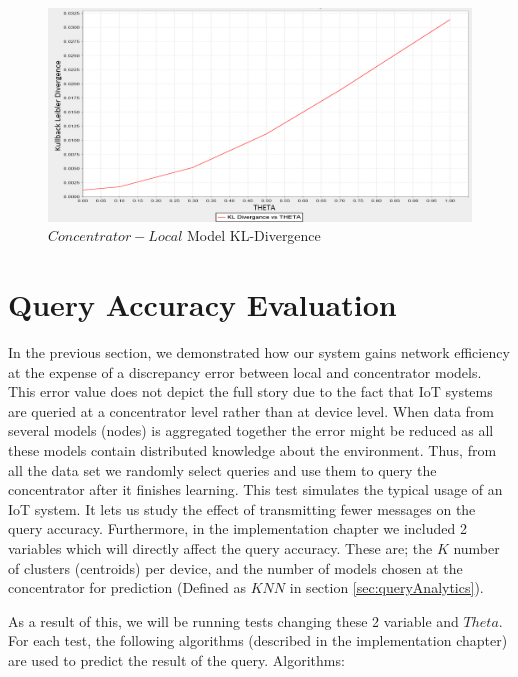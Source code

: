 \documentclass{mproj}
\begin{document}
\begin{figure}[H]
\caption{$Concentrator - Local$ Model KL-Divergence}
\label{fig:kldiv}
\centerline{\includegraphics[scale=0.4]{kldivergence}}
\end{figure}

\section{Query Accuracy Evaluation}

In the previous section, we demonstrated how our system gains network efficiency at the expense of a discrepancy error between local and concentrator models. This error value does not depict the full story due to the fact that IoT systems are queried at a concentrator level rather than at device level. When data from several models (nodes) is aggregated together the error might be reduced as all these models contain distributed knowledge about the environment. Thus, from all the data set we randomly select queries and use them to query the concentrator after it finishes learning. This test simulates the typical usage of an IoT system. It lets us study the effect of transmitting fewer messages on the query accuracy. Furthermore, in the implementation chapter we included 2 variables which will directly affect the query accuracy. These are; the $K$ number of clusters (centroids) per device, and the number of models chosen at the concentrator for prediction (Defined as $KNN$ in section \ref{sec:queryAnalytics}).

As a result of this, we will be running tests changing these 2 variable and $Theta$. For each test, the following algorithms (described in the implementation chapter) are used to predict the result of the query. Algorithms:
\end{document}
